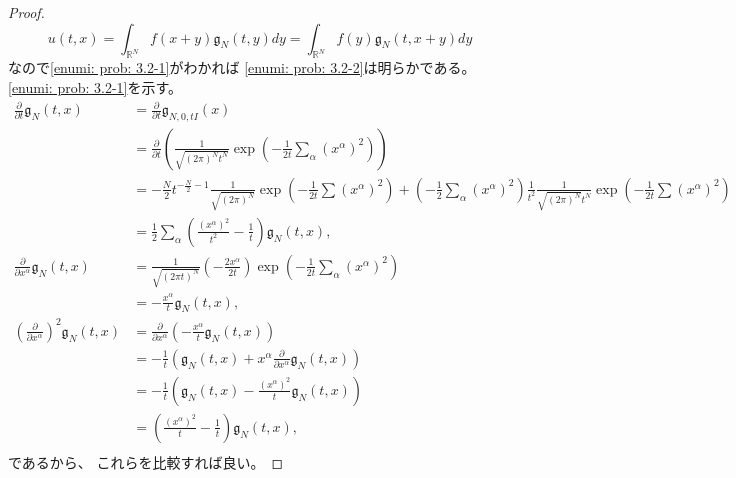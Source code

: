 \documentclass[uplatex]{jsarticle}
\theoremstyle{definition}
\def\R{\mathbb{R}}
\begin{document}
\begin{proof}
  \[
  u(t,x) = \int_{\R^N}f(x+y)\mathfrak{g}_N(t,y)dy
  = \int_{\R^N}f(y)\mathfrak{g}_N(t,x+y)dy
  \]
  なので\ref{enumi: prob: 3.2-1}がわかれば
  \ref{enumi: prob: 3.2-2}は明らかである。
  \ref{enumi: prob: 3.2-1}を示す。
  \begin{align*}
    \frac{\partial}{\partial t}\mathfrak{g}_N(t,x)
    &= \frac{\partial}{\partial t}\mathfrak{g}_{N,0,tI}(x) \\
    &= \frac{\partial}{\partial t}\left(
    \frac{1}{\sqrt{(2\pi)^Nt^N}}
    \exp\left( -\frac{1}{2t}\sum_\alpha (x^\alpha)^2\right)\right) \\
    &= -\frac{N}{2}t^{-\frac{N}{2}-1}\frac{1}{\sqrt{(2\pi)^N}}
    \exp\left( -\frac{1}{2t}\sum (x^\alpha)^2\right)
    + \left( -\frac{1}{2}\sum_{\alpha}(x^\alpha)^2\right)\frac{1}{t^2}
    \frac{1}{\sqrt{(2\pi)^N}t^N}
    \exp\left( -\frac{1}{2t}\sum (x^\alpha)^2\right) \\
    &= \frac{1}{2}\sum_{\alpha}\left( \frac{(x^\alpha)^2}{t^2}-\frac{1}{t}\right)
    \mathfrak{g}_{N}(t,x), \\
    \frac{\partial}{\partial x^\alpha} \mathfrak{g}_N(t,x)
    &= \frac{1}{\sqrt{(2\pi t)^N}}\left( -\frac{2x^\alpha}{2t}\right)
    \exp\left( -\frac{1}{2t}\sum_\alpha(x^\alpha)^2\right) \\
    &= -\frac{x^\alpha}{t}\mathfrak{g}_N(t,x), \\
    \left( \frac{\partial}{\partial x^\alpha}\right)^2 \mathfrak{g}_N(t,x)
    &= \frac{\partial}{\partial x^\alpha}
    \left( -\frac{x^\alpha}{t}\mathfrak{g}_N(t,x) \right) \\
    &= -\frac{1}{t}\left( \mathfrak{g}_N(t,x) + x^\alpha
    \frac{\partial}{\partial x^\alpha} \mathfrak{g}_N(t,x) \right) \\
    &= -\frac{1}{t}\left( \mathfrak{g}_N(t,x)
    - \frac{(x^\alpha)^2}{t}\mathfrak{g}_N(t,x) \right) \\
    &= \left( \frac{(x^\alpha)^2}{t} - \frac{1}{t}\right) \mathfrak{g}_N(t,x), \\
  \end{align*}
  であるから、
  これらを比較すれば良い。
\end{proof}
\end{document}
